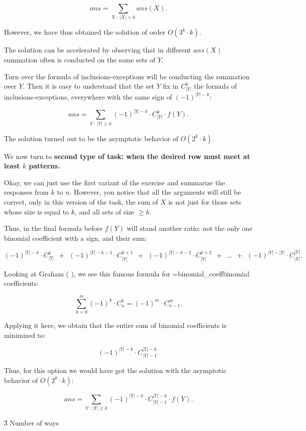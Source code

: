 $$ ans = \sum_{X ~ : ~ |X| = k} ans(X). $$

However, we have thus obtained the solution of order $O(3^k \cdot k)$.

The solution can be accelerated by observing that in different $ans(X)$ summation often is conducted on the same sets of $Y$.

Turn over the formula of inclusions-exceptions will be conducting the summation over $Y$. Then it is easy to understand that the set $Y$ fix in $C_{|Y|}^k$ the formula of inclusions-exceptions, everywhere with the same sign of $(-1)^{|Y|-k}$:

$$ ans = \sum_{Y ~ : ~ |Y| \ge k} (-1)^{|Y|-k} \cdot C_{|Y|}^k \cdot f(Y). $$

The solution turned out to be the asymptotic behavior of $O(2^k \cdot k)$.

We now turn to \bf{second type of task}: when the desired row must meet at least $k$ patterns.

Okay, we can just use the first variant of the exercise and summarize the responses from $k$ to $n$. However, you notice that all the arguments will still be correct, only in this version of the task, the sum of $X$ is not just for those sets whose size is equal to $k$, and all sets of size $\ge k$.

Thus, in the final formula before $f(Y)$ will stand another ratio: not the only one binomial coefficient with a sign, and their sum:

$$ (-1)^{|Y|-k} \cdot C_{|Y|}^k ~~ + ~~ (-1)^{|Y|-k-1} \cdot C_{|Y|}^{k+1} ~~ + ~~ (-1)^{|Y|-k-2} \cdot C_{|Y|}^{k+2} ~~ + ~~ \ldots ~~ + ~~ (-1)^{|Y|-|Y|} \cdot C_{|Y|}^{|Y|}. $$

Looking at Graham ( ), we see this famous formula for \algohref=binomial_coeff{binomial coefficients}:

$$ \sum_{k=0}^m (-1)^k \cdot C_n^k = (-1)^m \cdot C_{n-1}^m. $$

Applying it here, we obtain that the entire sum of binomial coefficients is minimized to:

$$ (-1)^{|Y|-k} \cdot C_{|Y|-1}^{|Y|-k}. $$

Thus, for this option we would have got the solution with the asymptotic behavior of $O(2^k \cdot k)$:

$$ ans = \sum_{Y ~ : ~ |Y| \ge k} (-1)^{|Y|-k} \cdot C_{|Y|-1}^{|Y|-k} \cdot f(Y). $$


\h3{ Number of ways }

